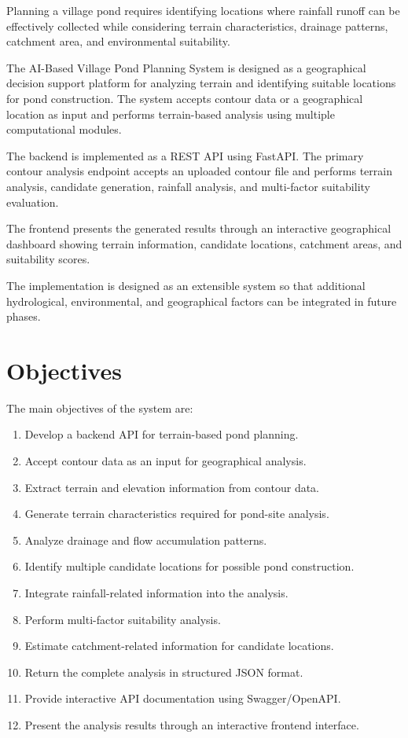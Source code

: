 \documentclass[12pt,a4paper]{article}
\begin{document}
Planning a village pond requires identifying locations where rainfall runoff can be
effectively collected while considering terrain characteristics, drainage patterns,
catchment area, and environmental suitability.

The AI-Based Village Pond Planning System is designed as a geographical decision
support platform for analyzing terrain and identifying suitable locations for pond
construction. The system accepts contour data or a geographical location as input
and performs terrain-based analysis using multiple computational modules.

The backend is implemented as a REST API using FastAPI. The primary contour analysis
endpoint accepts an uploaded contour file and performs terrain analysis, candidate
generation, rainfall analysis, and multi-factor suitability evaluation.

The frontend presents the generated results through an interactive geographical
dashboard showing terrain information, candidate locations, catchment areas, and
suitability scores.

The implementation is designed as an extensible system so that additional
hydrological, environmental, and geographical factors can be integrated in future
phases.

\section{Objectives}

The main objectives of the system are:

\begin{enumerate}
    \item Develop a backend API for terrain-based pond planning.
    \item Accept contour data as an input for geographical analysis.
    \item Extract terrain and elevation information from contour data.
    \item Generate terrain characteristics required for pond-site analysis.
    \item Analyze drainage and flow accumulation patterns.
    \item Identify multiple candidate locations for possible pond construction.
    \item Integrate rainfall-related information into the analysis.
    \item Perform multi-factor suitability analysis.
    \item Estimate catchment-related information for candidate locations.
    \item Return the complete analysis in structured JSON format.
    \item Provide interactive API documentation using Swagger/OpenAPI.
    \item Present the analysis results through an interactive frontend interface.
\end{enumerate}
\end{document}
